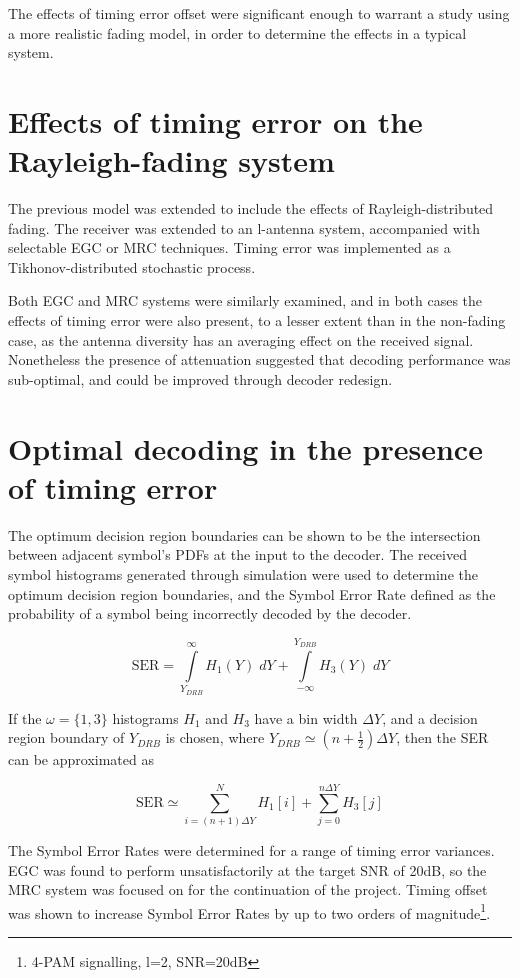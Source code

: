 The effects of timing error offset were significant enough to warrant a study using a more realistic fading model, in order to determine the effects in a typical system.

\section{Effects of timing error on the Rayleigh-fading system}

The previous model was extended to include the effects of Rayleigh-distributed fading. The receiver was extended to an l-antenna system, accompanied with selectable EGC or MRC techniques. Timing error was implemented as a Tikhonov-distributed stochastic process.

Both EGC and MRC systems were similarly examined, and in both cases the effects of timing error were also present, to a lesser extent than in the non-fading case, as the antenna diversity has an averaging effect on the received signal. Nonetheless the presence of attenuation suggested that decoding performance was sub-optimal, and could be improved through decoder redesign.

\section{Optimal decoding in the presence of timing error}

The optimum decision region boundaries can be shown to be the intersection between adjacent symbol's PDFs at the input to the decoder. The received symbol histograms generated through simulation were used to determine the optimum decision region boundaries, and the Symbol Error Rate defined as the probability of a symbol being incorrectly decoded by the decoder.

\[
\text{SER} = \int\limits_{Y_{DRB}}^{\infty} H_1 (Y) \; dY + \int\limits_{- \infty}^{Y_{DRB}} H_3 (Y) \; dY
\]

If the $\omega = \{ 1, 3 \}$ histograms $H_1$ and $H_3$ have a bin width $\Delta Y$, and a decision region boundary of $Y_{DRB}$ is chosen, where $Y_{DRB} \simeq (n + \frac{1}{2}) \Delta Y$, then the SER can be approximated as

\[
\text{SER} \simeq \sum\limits_{i = (n+1) \Delta Y}^{N} H_1 [i] + \sum\limits_{j = 0}^{n \Delta Y} H_3 [j]
\]

The Symbol Error Rates were determined for a range of timing error variances. EGC was found to perform unsatisfactorily at the target SNR of 20dB, so the MRC system was focused on for the continuation of the project.  Timing offset was shown to increase Symbol Error Rates by up to two orders of magnitude\footnote{4-PAM signalling, l=2, SNR=20dB}.


